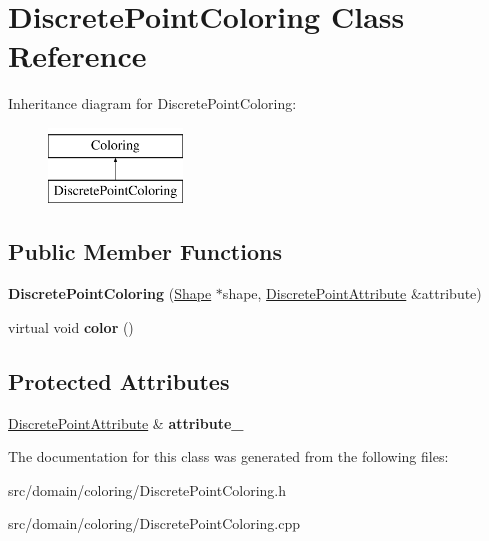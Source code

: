 \hypertarget{class_discrete_point_coloring}{}\section{Discrete\+Point\+Coloring Class Reference}
\label{class_discrete_point_coloring}
Inheritance diagram for Discrete\+Point\+Coloring\+:\begin{figure}[H]
\begin{center}
\leavevmode
\includegraphics[height=2.000000cm]{class_discrete_point_coloring}
\end{center}
\end{figure}
\subsection*{Public Member Functions}
\begin{DoxyCompactItemize}
\item 
\hypertarget{class_discrete_point_coloring_a3d112ea40b0775466b85479931c3d6fa}{}{\bfseries Discrete\+Point\+Coloring} (\hyperlink{class_shape}{Shape} $\ast$shape, \hyperlink{class_discrete_point_attribute}{Discrete\+Point\+Attribute} \&attribute)\label{class_discrete_point_coloring_a3d112ea40b0775466b85479931c3d6fa}

\item 
\hypertarget{class_discrete_point_coloring_acbc9d6aee4a0fb0e3994d3ca41a459a1}{}virtual void {\bfseries color} ()\label{class_discrete_point_coloring_acbc9d6aee4a0fb0e3994d3ca41a459a1}

\end{DoxyCompactItemize}
\subsection*{Protected Attributes}
\begin{DoxyCompactItemize}
\item 
\hypertarget{class_discrete_point_coloring_a560fb18a73bd3ca0da2b44b5ab66ef8a}{}\hyperlink{class_discrete_point_attribute}{Discrete\+Point\+Attribute} \& {\bfseries attribute\+\_\+}\label{class_discrete_point_coloring_a560fb18a73bd3ca0da2b44b5ab66ef8a}

\end{DoxyCompactItemize}


The documentation for this class was generated from the following files\+:\begin{DoxyCompactItemize}
\item 
src/domain/coloring/Discrete\+Point\+Coloring.\+h\item 
src/domain/coloring/Discrete\+Point\+Coloring.\+cpp\end{DoxyCompactItemize}
